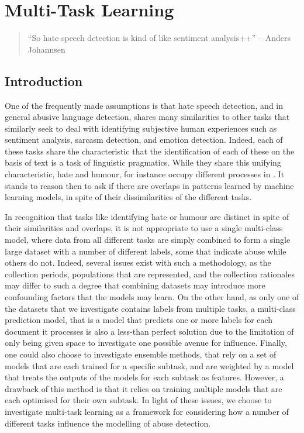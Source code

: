 \ifpdf
    \graphicspath{{Chapter6/Figs/Raster/}{Chapter6/Figs/PDF/}{Chapter6/Figs/}}
\else
    \graphicspath{{Chapter6/Figs/Vector/}{Chapter6/Figs/}}
\fi

\chapter{Multi-Task Learning}\label{chap:mtl}

\begin{quote}
  ``So hate speech detection is kind of like sentiment analysis++'' -- Anders Johannsen
\end{quote}

\section{Introduction}
One of the frequently made assumptions is that hate speech detection, and in general abusive language detection, shares many similarities to other tasks that similarly seek to deal with identifying subjective human experiences such as sentiment analysis, sarcasm detection, and emotion detection. Indeed, each of these tasks share the characteristic that the identification of each of these on the basis of text is a task of linguistic pragmatics. While they share this unifying characteristic, hate and humour, for instance occupy different processes in  \cite{CITE: Cite papers that find things about humour and hate}. It stands to reason then to ask if there are overlaps in patterns learned by machine learning models, in spite of their dissimilarities of the different tasks.

In recognition that tasks like identifying hate or humour are distinct in spite of their similarities and overlaps, it is not appropriate to use a single multi-class model, where data from all different tasks are simply combined to form a single large dataset with a number of different labels, some that indicate abuse while others do not. Indeed, several issues exist with such a methodology, as the collection periods, populations that are represented, and the collection rationales may differ to such a degree that combining datasets may introduce more confounding factors that the models may learn. On the other hand, as only one of the datasets that we investigate contains labels from multiple tasks, a multi-class prediction model, that is a model that predicts one or more labels for each document it processes is also a less-than perfect solution due to the limitation of only being given space to investigate one possible avenue for influence. Finally, one could also choose to investigate ensemble methods, that rely on a set of models that are each trained for a specific subtask, and are weighted by a model that treats the outputs of the models for each subtask as features. However, a drawback of this method is that it relies on training multiple models that are each optimised for their own subtask. In light of these issues, we choose to investigate multi-task learning as a framework for considering how a number of different tasks influence the modelling of abuse detection.

